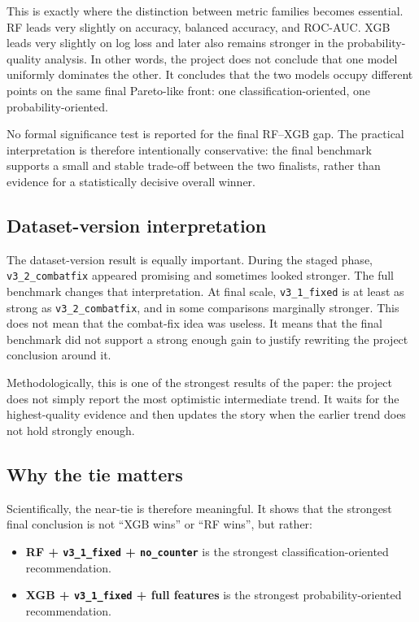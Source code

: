 \documentclass[11pt,a4paper]{article}
\begin{document}
This is exactly where the distinction between metric families becomes essential. RF leads very slightly on accuracy, balanced accuracy, and ROC-AUC. XGB leads very slightly on log loss and later also remains stronger in the probability-quality analysis. In other words, the project does not conclude that one model uniformly dominates the other. It concludes that the two models occupy different points on the same final Pareto-like front: one classification-oriented, one probability-oriented.

No formal significance test is reported for the final RF--XGB gap. The practical interpretation is therefore intentionally conservative: the final benchmark supports a small and stable trade-off between the two finalists, rather than evidence for a statistically decisive overall winner.

\subsection{Dataset-version interpretation}
The dataset-version result is equally important. During the staged phase, \texttt{v3\_2\_combatfix} appeared promising and sometimes looked stronger. The full benchmark changes that interpretation. At final scale, \texttt{v3\_1\_fixed} is at least as strong as \texttt{v3\_2\_combatfix}, and in some comparisons marginally stronger. This does not mean that the combat-fix idea was useless. It means that the final benchmark did not support a strong enough gain to justify rewriting the project conclusion around it.

Methodologically, this is one of the strongest results of the paper: the project does not simply report the most optimistic intermediate trend. It waits for the highest-quality evidence and then updates the story when the earlier trend does not hold strongly enough.

\subsection{Why the tie matters}
Scientifically, the near-tie is therefore meaningful. It shows that the strongest final conclusion is not ``XGB wins'' or ``RF wins'', but rather:
\begin{itemize}
    \item \textbf{RF + \texttt{v3\_1\_fixed} + \texttt{no\_counter}} is the strongest classification-oriented recommendation.
    \item \textbf{XGB + \texttt{v3\_1\_fixed} + full features} is the strongest probability-oriented recommendation.
\end{itemize}
\end{document}
